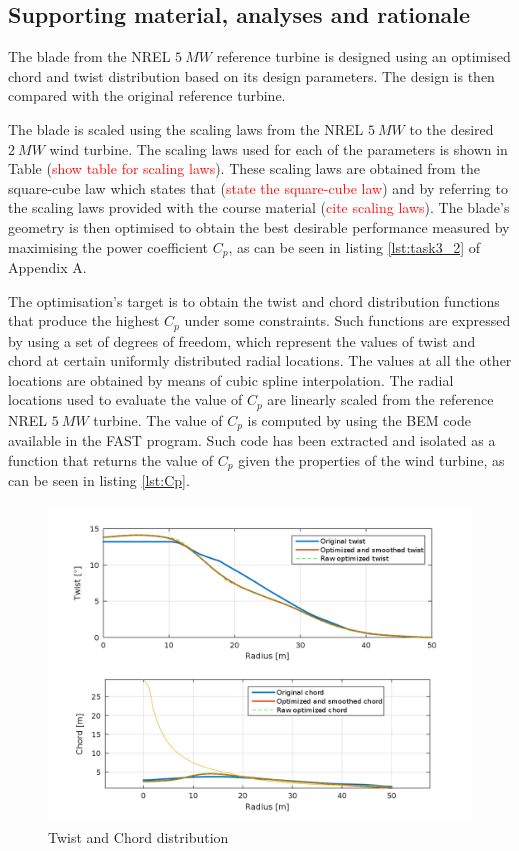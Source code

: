\subsection{Supporting material, analyses and rationale}
The blade from the NREL $5\ MW$ reference turbine \cite{5MW} is designed using an optimised chord and twist distribution based on its design parameters. The design is then compared with the original reference turbine.

The blade is scaled using the scaling laws from the NREL $5\ MW$ to the desired $2\ MW$ wind turbine. The scaling laws used for each of the parameters is shown in Table (\textcolor{red}{show table for scaling laws}). These scaling laws are obtained from the square-cube law which states that (\textcolor{red}{state the square-cube law}) and by referring to the scaling laws provided with the course material (\textcolor{red}{cite scaling laws}). The blade's geometry is then optimised to obtain the best desirable performance measured by maximising the power coefficient $C_p$, as can be seen in listing \ref{lst:task3_2} of Appendix A.

The optimisation's target is to obtain the twist and chord distribution functions that produce the highest $C_p$ under some constraints. Such functions are expressed by using a set of degrees of freedom, which represent the values of twist and chord at certain uniformly distributed radial locations. The values at all the other locations are obtained by means of cubic spline interpolation. The radial locations used to evaluate the value of $C_p$ are linearly scaled from the reference NREL $5\ MW$ turbine. The value of $C_p$ is computed by using the BEM code available in the FAST program. Such code has been extracted and isolated as a function that returns the value of $C_p$ given the properties of the wind turbine, as can be seen in listing \ref{lst:Cp}.


\begin{figure}[H]
\centering
\includegraphics[width=1.0\textwidth]{Images/twist_and_chord.png} 
\caption{Twist and Chord distribution}\label{fig:twist_and_chord}
\end{figure}

